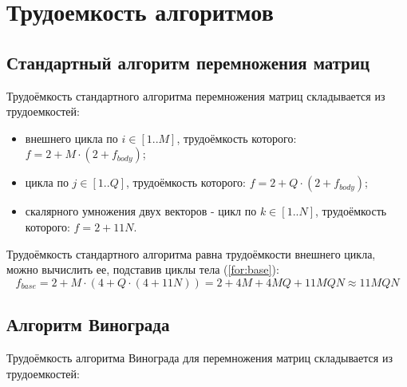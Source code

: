 \section{Трудоемкость алгоритмов}
\subsection{Стандартный алгоритм перемножения матриц}

Трудоёмкость стандартного алгоритма перемножения матриц складывается из трудоемкостей:
\begin{itemize}
	\item внешнего цикла по $i \in [1..M]$, трудоёмкость которого: $f = 2 + M \cdot (2 + f_{body})$;
	\item цикла по $j \in [1..Q]$, трудоёмкость которого: $f = 2 + Q \cdot (2 + f_{body})$;
	\item скалярного умножения двух векторов - цикл по $k \in [1..N]$, трудоёмкость которого: $f = 2 + 11N$.
\end{itemize}

Трудоёмкость стандартного алгоритма равна трудоёмкости внешнего цикла, можно вычислить ее, подставив циклы тела (\ref{for:base}):
\begin{equation}
	\label{for:base}
	f_{base} = 2 + M \cdot (4 + Q \cdot (4 + 11N)) = 2 + 4M + 4MQ + 11MQN \approx 11MQN
\end{equation}

\subsection{Алгоритм Винограда}

Трудоёмкость алгоритма Винограда для перемножения матриц складывается из трудоемкостей:


